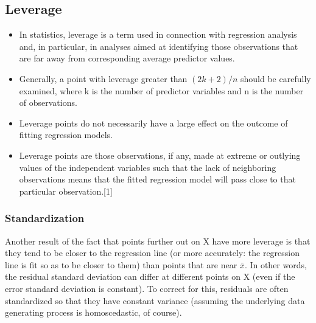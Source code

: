 \documentclass[residuals.tex]{subfiles}
\begin{document}
\subsection{Leverage}
\begin{itemize}
\item In statistics, leverage is a term used in connection with regression analysis and, in particular, in analyses aimed at identifying those observations that are far away from corresponding average predictor values.

\item Generally, a point with leverage greater than $(2k+2)/n$ should be carefully examined, where k is the number of predictor variables and n is the number of observations.
\item  Leverage points do not necessarily have a large effect on the outcome of fitting regression models.

\item Leverage points are those observations, if any, made at extreme or outlying values of the independent variables such that the lack of neighboring observations means that the fitted regression model will pass close to that particular observation.[1]


\end{itemize}

\subsubsection{Standardization}
Another result of the fact that points further out on X have more leverage is that they tend to be closer to the regression line (or more accurately: the regression line is fit so as to be closer to them) than points that are near $\bar{x}$. In other words, the residual standard deviation can differ at different points on X (even if the error standard deviation is constant). To correct for this, residuals are often standardized so that they have constant variance (assuming the underlying data generating process is homoscedastic, of course).

\end{document}
